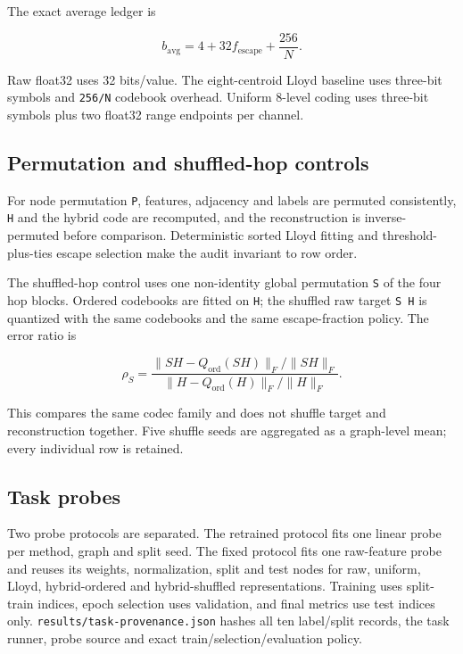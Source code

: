 \documentclass{article}
\begin{document}
The exact average ledger is

\[
b_{\mathrm{avg}} = 4 + 32 f_{\mathrm{escape}} + \frac{256}{N}.
\]

Raw float32 uses 32 bits/value. The eight-centroid Lloyd baseline uses three-bit symbols and \texttt{256/N} codebook overhead. Uniform 8-level coding uses three-bit symbols plus two float32 range endpoints per channel.

\subsection{Permutation and shuffled-hop controls}

\label{sec:permutation_and_shuffled_hop_controls}

For node permutation \texttt{P}, features, adjacency and labels are permuted consistently, \texttt{H} and the hybrid code are recomputed, and the reconstruction is inverse-permuted before comparison. Deterministic sorted Lloyd fitting and threshold-plus-ties escape selection make the audit invariant to row order.

The shuffled-hop control uses one non-identity global permutation \texttt{S} of the four hop blocks. Ordered codebooks are fitted on \texttt{H}; the shuffled raw target \texttt{S H} is quantized with the same codebooks and the same escape-fraction policy. The error ratio is

\[
\rho_S = \frac{\|S H - Q_{\mathrm{ord}}(S H)\|_F/\|S H\|_F}{\|H-Q_{\mathrm{ord}}(H)\|_F/\|H\|_F}.
\]

This compares the same codec family and does not shuffle target and reconstruction together. Five shuffle seeds are aggregated as a graph-level mean; every individual row is retained.

\subsection{Task probes}

\label{sec:task_probes}

Two probe protocols are separated. The retrained protocol fits one linear probe per method, graph and split seed. The fixed protocol fits one raw-feature probe and reuses its weights, normalization, split and test nodes for raw, uniform, Lloyd, hybrid-ordered and hybrid-shuffled representations. Training uses split-train indices, epoch selection uses validation, and final metrics use test indices only. \texttt{results/task-provenance.json} hashes all ten label/split records, the task runner, probe source and exact train/selection/evaluation policy.
\end{document}
